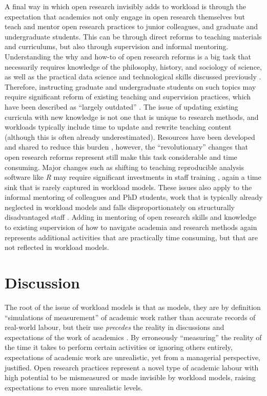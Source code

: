 \documentclass[meta, authordate]{jote-new-article}
\begin{document}
A final way in which open research invisibly adds to workload is through the expectation that academics not only engage in open research themselves but teach and mentor open research practices to junior colleagues, and graduate and undergraduate students. This can be through direct reforms to teaching materials and curriculums, but also through supervision and informal mentoring. Understanding the why and how-to of open research reforms is a big task that necessarily requires knowledge of the philosophy, history, and sociology of science, as well as the practical data science and technological skills discussed previously \parencites{Crüwell2019}. Therefore, instructing graduate and undergraduate students on such topics may require significant reform of existing teaching and supervision practices, which have been described as “largely outdated” \parencites{Azevedo2022}. The issue of updating existing curricula with new knowledge is not one that is unique to research methods, and workloads typically include time to update and rewrite teaching content (although this is often already underestimated). Resources have been developed and shared to reduce this burden \parencites[e.g., lesson plans][]{Pownall2021}, however, the “revolutionary” changes that open research reforms represent \parencites{Spellman2015} still make this task considerable and time consuming. Major changes such as shifting to teaching reproducible analysis software like \emph{R} may require significant investments in staff training \parencites[e.g.][]{Barr2019}, again a time sink that is rarely captured in workload models. These issues also apply to the informal mentoring of colleagues and PhD students, work that is typically already neglected in workload models and falls disproportionately on structurally disadvantaged staff \parencites{Gordon2022}. Adding in mentoring of open research skills and knowledge to existing supervision of how to navigate academia and research methods again represents additional activities that are practically time consuming, but that are not reflected in workload models.



\section{Discussion}



The root of the issue of workload models is that as models, they are by definition “simulations of measurement” of academic work rather than accurate records of real-world labour, but their use \emph{precedes} the reality in discussions and expectations of the work of academics \parencites{Papadopoulos2017}. By erroneously “measuring” the reality of the time it takes to perform certain activities or ignoring others entirely, expectations of academic work are unrealistic, yet from a managerial perspective, justified. Open research practices represent a novel type of academic labour with high potential to be mismeasured or made invisible by workload models, raising expectations to even more unrealistic levels.
\end{document}
